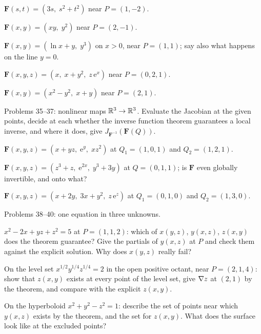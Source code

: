\begin{problems}[resume]
  \item $\mathbf{F}(s,t)=(3s,\;s^{2}+t^{2})$ near $P=(1,-2)$.
  \item $\mathbf{F}(x,y)=(xy,\;y^{2})$ near $P=(2,-1)$.
  \item $\mathbf{F}(x,y)=(\ln x+y,\;y^{3})$ on $x>0$, near $P=(1,1)$; say
        also what happens on the line $y=0$.
  \item $\mathbf{F}(x,y,z)=(x,\;x+y^{2},\;z\,\mathrm{e}^{x})$ near
        $P=(0,2,1)$.
  \item $\mathbf{F}(x,y)=(x^{2}-y^{2},\;x+y)$ near $P=(2,1)$.
\end{problems}

Problems 35--37: nonlinear maps $\mathbb{R}^{3}\to\mathbb{R}^{3}$. Evaluate the Jacobian at
the given points, decide at each whether the inverse function theorem
guarantees a local inverse, and where it does, give
$J_{\mathbf{F}^{-1}}(\mathbf{F}(Q))$.

\begin{problems}[resume]
  \item $\mathbf{F}(x,y,z)=(x+yz,\;\mathrm{e}^{y},\;xz^{2})$ at
        $Q_{1}=(1,0,1)$ and $Q_{2}=(1,2,1)$.
  \item $\mathbf{F}(x,y,z)=(z^{3}+z,\;\mathrm{e}^{2x},\;y^{3}+3y)$ at
        $Q=(0,1,1)$; is $\mathbf{F}$ even globally invertible, and onto
        what?
  \item $\mathbf{F}(x,y,z)=(x+2y,\;3x+y^{2},\;z\,\mathrm{e}^{z})$ at
        $Q_{1}=(0,1,0)$ and $Q_{2}=(1,3,0)$.
\end{problems}

Problems 38--40: one equation in three unknowns.

\begin{problems}[resume]
  \item $x^{2}-2x+yz+z^{2}=5$ at $P=(1,1,2)$: which of $x(y,z)$,
        $y(x,z)$, $z(x,y)$ does the theorem guarantee? Give the partials of
        $y(x,z)$ at $P$ and check them against the explicit solution. Why
        does $x(y,z)$ really fail?
  \item On the level set $x^{1/2}y^{1/4}z^{1/4}=2$ in the open positive
        octant, near $P=(2,1,4)$: show that $z(x,y)$ exists at every point
        of the level set, give $\nabla z$ at $(2,1)$ by the theorem, and
        compare with the explicit $z(x,y)$.
  \item On the hyperboloid $x^{2}+y^{2}-z^{2}=1$: describe the set of
        points near which $y(x,z)$ exists by the theorem, and the set for
        $z(x,y)$. What does the surface look like at the excluded points?
\end{problems}

